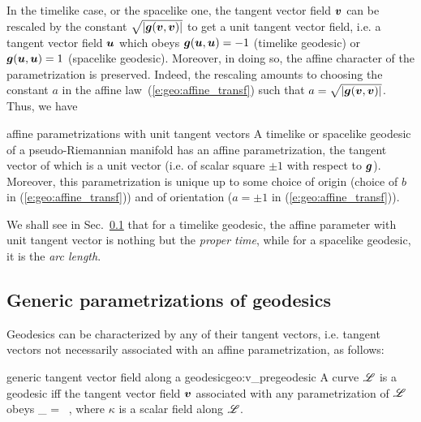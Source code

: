 In the timelike case, or the spacelike one,
the tangent vector field $\bm{v}$ can be rescaled by the constant $\sqrt{|\bm{g}(\bm{v},\bm{v})|}$ to get
a unit tangent vector field, i.e. a tangent vector field $\bm{u}$ which obeys
$\bm{g}(\bm{u},\bm{u}) = -1$ (timelike geodesic) or $\bm{g}(\bm{u},\bm{u}) = 1$
(spacelike geodesic). Moreover, in doing so, the affine character of the
parametrization is preserved. Indeed, the rescaling amounts to choosing the constant $a$
in the affine law~(\ref{e:geo:affine_transf}) such that $a = \sqrt{|\bm{g}(\bm{v},\bm{v})|}$.
Thus, we have
\begin{tprop}{affine parametrizations with unit tangent vectors}{}
A timelike or spacelike geodesic of a pseudo-Riemannian manifold has an affine parametrization,
the tangent vector of which is a unit vector (i.e. of scalar square $\pm 1$ with respect to
$\bm{g}$). Moreover, this parametrization is unique up to some choice of origin
(choice of $b$ in (\ref{e:geo:affine_transf})) and of
orientation ($a=\pm 1$ in (\ref{e:geo:affine_transf})).
\end{tprop}
We shall see in Sec.~\ref{s:geo:gener_param} that for a timelike geodesic,
the affine parameter with unit tangent vector is nothing but the
\emph{proper time}, while for a spacelike
geodesic, it is the \emph{arc length}.

\subsection{Generic parametrizations of geodesics} \label{s:geo:gener_param}

Geodesics can be characterized by any of their tangent vectors, i.e.
tangent vectors not necessarily associated with an affine parametrization, as follows:
\begin{tprop}{generic tangent vector field along a geodesic}{geo:v_pregeodesic}
A curve $\mathscr{L}$ is a geodesic
iff the tangent vector field $\bm{v}$ associated with any parametrization
of $\mathscr{L}$ obeys
\be \label{e:geo:v_pregeodesic}
    \wnab_{\!} = \kappa\,  ,
\ee
where $\kappa$ is a scalar field along $\mathscr{L}$.
\end{tprop}

